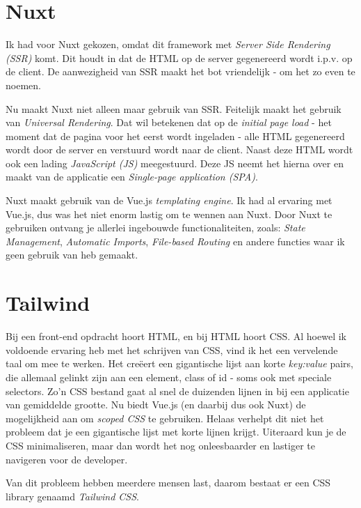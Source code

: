 \documentclass[a4paper]{report}
\begin{document}
    \section{Nuxt}
    Ik had voor Nuxt gekozen, omdat dit framework met \textit{Server Side Rendering (SSR)} komt.
    Dit houdt in dat de HTML op de server gegenereerd wordt i.p.v. op de client. De aanwezigheid van SSR maakt het bot vriendelijk - om het zo even te noemen.

    Nu maakt Nuxt niet alleen maar gebruik van SSR. Feitelijk maakt het gebruik van \textit{Universal Rendering}.
    Dat wil betekenen dat op de \textit{initial page load} - het moment dat de pagina voor het eerst wordt ingeladen - alle HTML gegenereerd wordt door de server
    en verstuurd wordt naar de client. Naast deze HTML wordt ook een lading \textit{JavaScript (JS)} meegestuurd. Deze JS neemt het hierna over en maakt van de applicatie een
    \textit{Single-page application (SPA)}.

    Nuxt maakt gebruik van de Vue.js \textit{templating engine}. Ik had al ervaring met Vue.js, dus was het niet enorm lastig om te wennen aan Nuxt.
    Door Nuxt te gebruiken ontvang je allerlei ingebouwde functionaliteiten, zoals:
    \textit{State Management},
    \textit{Automatic Imports},
    \textit{File-based Routing}
    en andere functies waar ik geen gebruik van heb gemaakt.

    \section{Tailwind}
    Bij een front-end opdracht hoort HTML, en bij HTML hoort CSS.
    Al hoewel ik voldoende ervaring heb met het schrijven van CSS, vind ik het een vervelende taal om mee te werken.
    Het creëert een gigantische lijst aan korte \textit{key:value} pairs, die allemaal gelinkt zijn aan een element, class of id - soms ook met speciale selectors.
    Zo'n CSS bestand gaat al snel de duizenden lijnen in bij een applicatie van gemiddelde grootte. Nu biedt Vue.js (en daarbij dus ook Nuxt) de mogelijkheid aan om
    \textit{scoped CSS} te gebruiken. Helaas verhelpt dit niet het probleem dat je een gigantische lijst met korte lijnen krijgt.
    Uiteraard kun je de CSS minimaliseren, maar dan wordt het nog onleesbaarder en lastiger te navigeren voor de developer.

    Van dit probleem hebben meerdere mensen last, daarom bestaat er een CSS library genaamd \textit{Tailwind CSS}.
\end{document}
